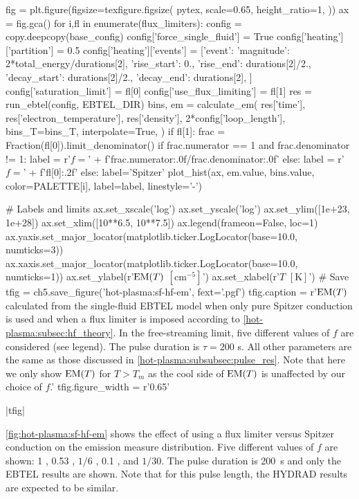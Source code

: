 \begin{pycode}[chapter5]
fig = plt.figure(figsize=texfigure.figsize(
    pytex,
    scale=0.65,
    height_ratio=1,
))
ax = fig.gca()
for i,fl in enumerate(flux_limiters):
    config = copy.deepcopy(base_config)
    config['force_single_fluid'] = True
    config['heating']['partition'] = 0.5
    config['heating']['events'] = [{'event': {
        'magnitude': 2*total_energy/durations[2],
        'rise_start': 0.,
        'rise_end': durations[2]/2.,
        'decay_start': durations[2]/2.,
        'decay_end': durations[2],
    }}]
    config['saturation_limit'] = fl[0]
    config['use_flux_limiting'] = fl[1]
    res = run_ebtel(config, EBTEL_DIR)
    bins, em = calculate_em(
        res['time'],
        res['electron_temperature'],
        res['density'],
        2*config['loop_length'],
        bins_T=bins_T,
        interpolate=True,
    )
    if fl[1]:
        frac = Fraction(fl[0]).limit_denominator()
        if frac.numerator == 1 and frac.denominator != 1:
            label = r'$f=$' + f'{frac.numerator:.0f}/{frac.denominator:.0f}'
        else:
            label = r'$f=$' + f'{fl[0]:.2f}'
    else:
        label='Spitzer'
    plot_hist(ax, em.value, bins.value, color=PALETTE[i], label=label, linestyle='-')

# Labels and limits
ax.set_xscale('log')
ax.set_yscale('log')
ax.set_ylim([1e+23, 1e+28])
ax.set_xlim([10**6.5, 10**7.5])
ax.legend(frameon=False, loc=1)
ax.yaxis.set_major_locator(matplotlib.ticker.LogLocator(base=10.0, numticks=3))
ax.xaxis.set_major_locator(matplotlib.ticker.LogLocator(base=10.0, numticks=1))
ax.set_ylabel(r'$\textup{EM}(T)$ $[\si{\cm\tothe{-5}}]$')
ax.set_xlabel(r'$T$ $[\si{\kelvin}]$')
# Save
tfig = ch5.save_figure('hot-plasma:sf-hf-em', fext='.pgf')
tfig.caption = r'$\emd[T]$ calculated from the single-fluid EBTEL model when only pure Spitzer conduction is used and when a flux limiter is imposed according to \autoref{hot-plasma:subsec:hf_theory}. In the free-streaming limit, five different values of $f$ are considered (see legend). The pulse duration is $\tau=200$ s. All other parameters are the same as those discussed in \autoref{hot-plasma:subsubsec:pulse_res}. Note that here we only show $\emd[T]$ for $T>T_m$ as the cool side of $\emd[T]$ is unaffected by our choice of $f$.'
tfig.figure_width = r'0.65\textwidth'
\end{pycode}
\py[chapter5]|tfig|

\autoref{fig:hot-plasma:sf-hf-em} shows the effect of using a flux limiter versus Spitzer conduction on the emission measure distribution. Five different values of $f$ are shown: 1 \citep[consistent with HYDRAD]{bradshaw_influence_2013}, 0.53 \citep{karpen_nonlocal_1987}, $1/6$ \citep{patsourakos_coronal_2005}, 0.1 \citep{luciani_nonlocal_1983}, and $1/30$. The pulse duration is \SI{200}{\second} and only the EBTEL results are shown. Note that for this pulse length, the HYDRAD results are expected to be similar.

